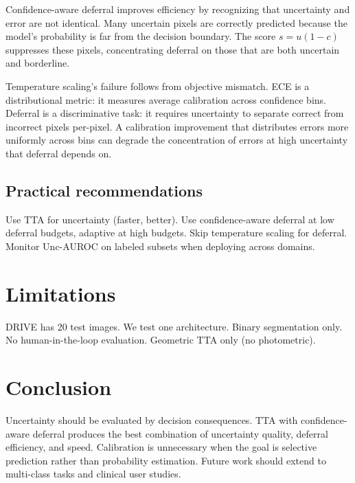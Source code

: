 \documentclass[review,3p]{elsarticle}
\begin{document}
Confidence-aware deferral improves efficiency by recognizing that uncertainty
and error are not identical. Many uncertain pixels are correctly predicted
because the model's probability is far from the decision boundary. The score
$s = u(1-c)$ suppresses these pixels, concentrating deferral on those that
are both uncertain and borderline.

Temperature scaling's failure follows from objective mismatch. ECE is a
distributional metric: it measures average calibration across confidence bins.
Deferral is a discriminative task: it requires uncertainty to separate correct
from incorrect pixels per-pixel. A calibration improvement that distributes
errors more uniformly across bins can degrade the concentration of errors at
high uncertainty that deferral depends on.

\subsection{Practical recommendations}

Use TTA for uncertainty (faster, better). Use confidence-aware deferral at low
deferral budgets, adaptive at high budgets. Skip temperature scaling for
deferral. Monitor Unc-AUROC on labeled subsets when deploying across domains.

\section{Limitations}

DRIVE has 20 test images. We test one architecture. Binary segmentation only.
No human-in-the-loop evaluation. Geometric TTA only (no photometric).

\section{Conclusion}

Uncertainty should be evaluated by decision consequences. TTA with
confidence-aware deferral produces the best combination of uncertainty quality,
deferral efficiency, and speed. Calibration is unnecessary when the goal is
selective prediction rather than probability estimation. Future work should
extend to multi-class tasks and clinical user studies.



\end{document}
